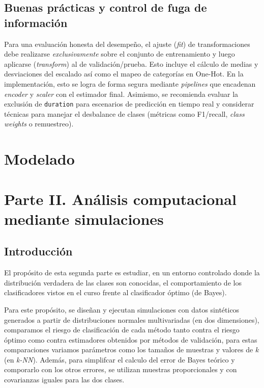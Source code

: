 \documentclass[10pt]{article}
\begin{document}
\subsection*{Buenas prácticas y control de fuga de información}
Para una evaluación honesta del desempeño, el ajuste (\emph{fit}) de transformaciones debe realizarse \emph{exclusivamente} sobre el conjunto de entrenamiento y luego aplicarse (\emph{transform}) al de validación/prueba. Esto incluye el cálculo de medias y desviaciones del escalado así como el mapeo de categorías en One-Hot. En la implementación, esto se logra de forma segura mediante \emph{pipelines} que encadenan \textit{encoder} y \textit{scaler} con el estimador final. Asimismo, se recomienda evaluar la exclusión de \texttt{duration} para escenarios de predicción en tiempo real y considerar técnicas para manejar el desbalance de clases (métricas como F1/recall, \emph{class weights} o remuestreo).






\section{Modelado}

\newpage

\section{Parte II. Análisis computacional mediante simulaciones}

\subsection*{Introducción}

El propósito de esta segunda parte es estudiar, en un entorno controlado donde
la distribución verdadera de las clases son conocidas, el comportamiento de los
clasificadores vistos en el curso frente al clasificador óptimo (de Bayes).

Para este propósito, se diseñan y ejecutan simulaciones con datos sintéticos
generados a partir de distribuciones normales multivariadas (en dos
dimensiones), comparamos el riesgo de clasificación de cada método tanto contra
el riesgo óptimo como contra estimadores obtenidos por métodos de validación, 
para estas comparaciones variamos parámetros como los tamaños de muestras y
valores de $k$ (en \textit{k-NN}). Además, para simplifcar el calculo del error
de Bayes teórico y comporarlo con los otros errores, se utilizan muestras
proporcionales y con covarianzas iguales para las dos clases.
\end{document}
